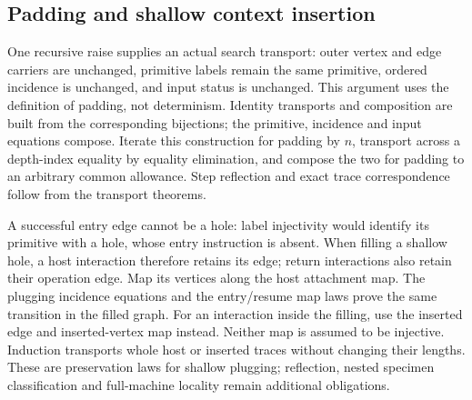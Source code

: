 




\subsection{Padding and shallow context insertion}

One recursive raise supplies an actual search transport: outer vertex and
edge carriers are unchanged, primitive labels remain the same primitive,
ordered incidence is unchanged, and input status is unchanged. This argument
uses the definition of padding, not determinism. Identity transports and
composition are built from the corresponding bijections; the primitive,
incidence and input equations compose. Iterate this construction for padding
by $n$, transport across a depth-index equality by equality elimination, and
compose the two for padding to an arbitrary common allowance. Step reflection
and exact trace correspondence follow from the transport theorems.









A successful entry edge cannot be a hole: label injectivity would identify
its primitive with a hole, whose entry instruction is absent. When filling a
shallow hole, a host interaction therefore retains its edge; return interactions
also retain their operation edge. Map its vertices along the host attachment
map. The plugging incidence equations and the entry/resume map laws prove the
same transition in the filled graph. For an interaction inside the filling,
use the inserted edge and inserted-vertex map instead. Neither map is assumed
to be injective. Induction transports whole host or inserted traces without
changing their lengths. These are preservation laws for shallow plugging;
reflection, nested specimen classification and full-machine locality remain
additional obligations.

